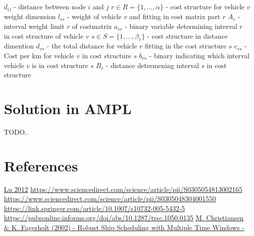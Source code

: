 \documentclass[a4paper,12pt]{article}
\begin{document}
$d_{ij}$ - distance between node $i$ and $j$\newline
$r \in R = \{1,...,\alpha\}$ - cost structure for vehicle $v$ weight dimension\newline
$l_{vr}$ - weight of vehicle $v$ and fitting in cost matrix part $r$ \newline
$A_r$ - interval weight limit $r$ of costmatrix\newline
$a_{vr}$ - binary variable determining interval $r$ in cost structure of vehicle $v$\newline 
$s \in S = \{1,...,\beta_v\}$ - cost structure in distance dimention \newline
$d_{vs}$ - the total distance for vehicle $v$ fitting in the cost structure $s$ \newline
$c_{vs}$ - Cost per km for vehicle $v$ in cost structure $s$ \newline
$b_{vs}$ - binary indicating which interval vehicle $v$ is in cost structure $s$ \newline
$B_s$ - distance determening interval $s$ in cost structure
\section{Solution in AMPL}
TODO.. 

\section{References} \label{sec:Ref}

\href{http://www-bcf.usc.edu/~maged/publications/MultiplePickup.pdf}{Lu 2012} \newline
\url{https://www.sciencedirect.com/science/article/pii/S0305054813002165} \newline
\url{https://www.sciencedirect.com/science/article/pii/S0305048304001550} \newline
\url{https://link.springer.com/article/10.1007/s10732-005-5432-5} \newline
\url{https://pubsonline.informs.org/doi/abs/10.1287/trsc.1050.0135} \newline
\href{https://onlinelibrary.wiley.com/doi/epdf/10.1002/nav.10033}{M. Christiansen \& K. Fagerholt (2002) - Robust Ship Scheduling with Multiple Time Windows - } \newline
\end{document}
